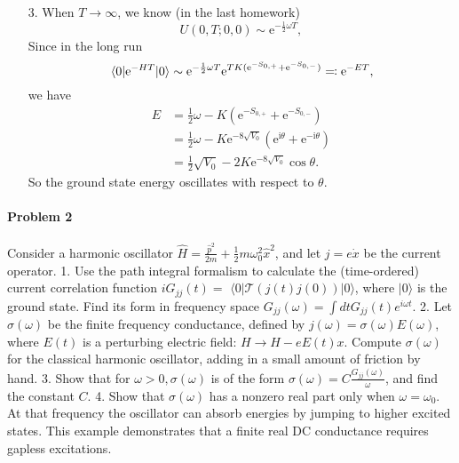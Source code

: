 \documentclass[hyperref, a4paper]{article}
\newcommand*{\ii}{\mathrm{i}}
\newcommand*{\ee}{\mathrm{e}}
\begin{document}
\begin{itemize}
\item[3.] When $T \to \infty$,
we know (in the last homework) 
\begin{equation}
    U(0, T; 0, 0) \sim \ee^{- \frac{1}{2} \omega T},
\end{equation}
Since in the long run 
\begin{equation}
    \expval{\ee^{- HT}}{0} \sim \ee^{- \frac{1}{2} \omega T} \ee^{TK (\ee^{- S_{0, +}} + \ee^{- S_{0, -}})} 
    \eqqcolon \ee^{- E T},
\end{equation}
we have 
\begin{equation}
    \begin{aligned}
        E &= \frac{1}{2} \omega - K ( \ee^{- S_{0, +}} + \ee^{- S_{0, -}} ) \\
        &= \frac{1}{2} \omega - K \ee^{- 8 \sqrt{V_0}} ( \ee^{\ii \theta} + \ee^{- \ii \theta} ) \\
        &= \frac{1}{2} \sqrt{V_0} - 2 K \ee^{- 8 \sqrt{V_0}} \cos\theta.
    \end{aligned}
\end{equation}
So the ground state energy oscillates with respect to $\theta$.

\end{itemize}



\paragraph{Problem 2} Consider a harmonic oscillator $\hat{H}=\frac{\hat{p}^2}{2 m}+\frac{1}{2} m \omega_0^2 \hat{x}^2$, and let $j=e \dot{x}$ be the current operator.
1. Use the path integral formalism to calculate the (time-ordered) current correlation function $i G_{j j}(t)=$ $\langle 0|\mathcal{T}(j(t) j(0))| 0\rangle$, where $|0\rangle$ is the ground state. Find its form in frequency space $G_{j j}(\omega)=\int d t G_{j j}(t) e^{i \omega t}$.
2. Let $\sigma(\omega)$ be the finite frequency conductance, defined by $j(\omega)=\sigma(\omega) E(\omega)$, where $E(t)$ is a perturbing electric field: $H \rightarrow H-e E(t) x$. Compute $\sigma(\omega)$ for the classical harmonic oscillator, adding in a small amount of friction by hand.
3. Show that for $\omega>0, \sigma(\omega)$ is of the form $\sigma(\omega)=C \frac{G_{j j}(\omega)}{\omega}$, and find the constant $C$.
4. Show that $\sigma(\omega)$ has a nonzero real part only when $\omega=\omega_0$. At that frequency the oscillator can absorb energies by jumping to higher excited states. This example demonstrates that a finite real DC conductance requires gapless excitations.
\end{document}
